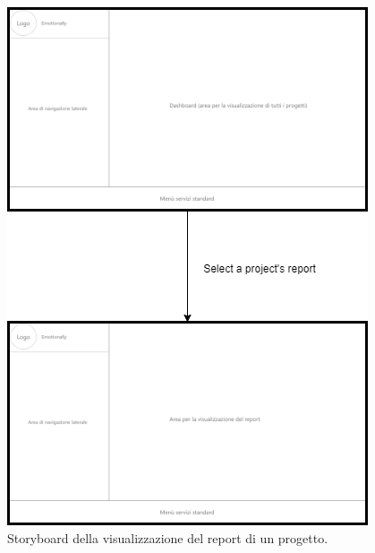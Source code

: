 \begin{figure}[H]
	\centering
	\caption{Storyboard della visualizzazione del report di un progetto.}
	\label{fig:storyboard:report-project}
	\includegraphics[height=\textheight-3ex]{images/storyboard/report-project}
\end{figure}

